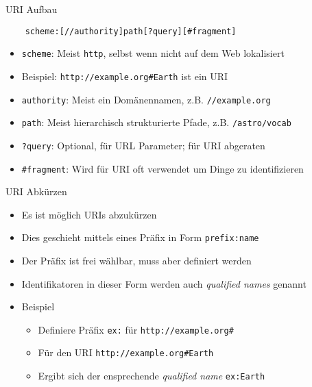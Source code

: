 \documentclass{beamer}
\begin{document}
\begin{frame}[fragile]{URI Aufbau}
	
	\begin{lstlisting}
	scheme:[//authority]path[?query][#fragment]
	\end{lstlisting}
	
	\vspace{0.5cm}
	
	\begin{itemize}
		\item \texttt{scheme}: Meist \texttt{http}, selbst wenn nicht auf dem Web lokalisiert
		\item Beispiel: \texttt{http://example.org\#Earth} ist ein URI
		\item \texttt{authority}: Meist ein Domänennamen, z.B. \texttt{//example.org}
		\item \texttt{path}: Meist hierarchisch strukturierte Pfade, z.B. \texttt{/astro/vocab}
		\item \texttt{?query}: Optional, für URL Parameter; für URI abgeraten
		\item \texttt{\#fragment}: Wird für URI oft verwendet um Dinge zu identifizieren
	\end{itemize}
	
\end{frame}

\begin{frame}[fragile]{URI Abkürzen}
	
	\begin{itemize}
		\item Es ist möglich URIs abzukürzen
		\item Dies geschieht mittels eines Präfix in Form \texttt{prefix:name}
		\item Der Präfix ist frei wählbar, muss aber definiert werden
		\item Identifikatoren in dieser Form werden auch \emph{qualified names} genannt
		\item Beispiel
		\begin{itemize}
			\item Definiere Präfix \texttt{ex:} für \texttt{http://example.org\#}
			\item Für den URI \texttt{http://example.org\#Earth}
			\item Ergibt sich der ensprechende \emph{qualified name} \texttt{ex:Earth} 
		\end{itemize}
	\end{itemize}
	
\end{frame}
\end{document}
